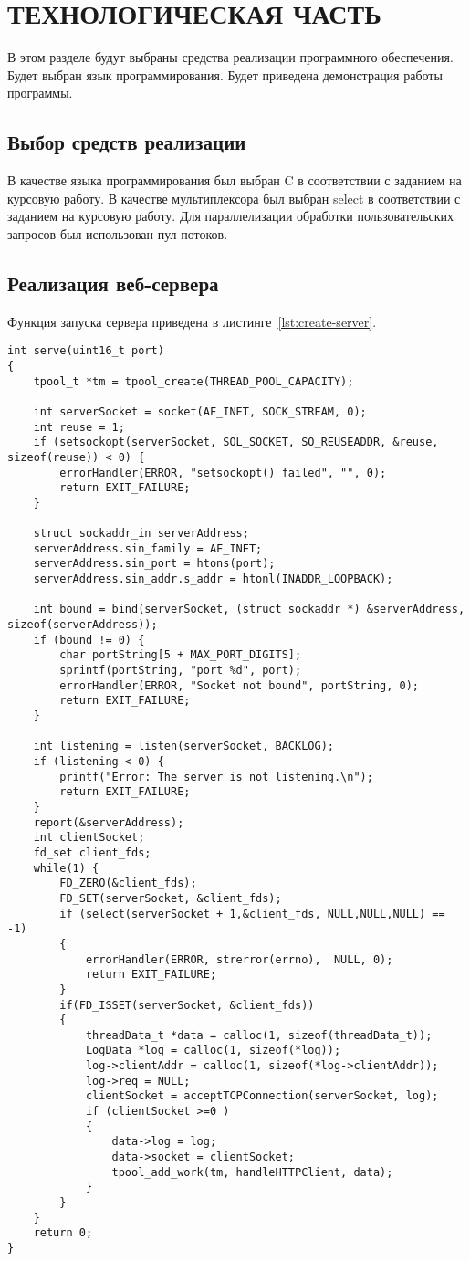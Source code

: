 \chapter{ТЕХНОЛОГИЧЕСКАЯ ЧАСТЬ}

В этом разделе будут выбраны средства реализации программного обеспечения. Будет выбран язык программирования. Будет приведена демонстрация работы программы.

\section{Выбор средств реализации}

В качестве языка программирования был выбран C в соответствии с заданием на курсовую работу. В качестве мультиплексора был выбран select в соответствии с заданием на курсовую работу. Для параллелизации обработки пользовательских запросов был использован пул потоков.

\section{Реализация веб-сервера}

Функция запуска сервера приведена в листинге~\ref{lst:create-server}.

\captionsetup{justification=raggedright,singlelinecheck=off}
\begin{lstlisting}[label=lst:create-server, caption=Запуск сервера]
int serve(uint16_t port)
{
	tpool_t *tm = tpool_create(THREAD_POOL_CAPACITY);
	
	int serverSocket = socket(AF_INET, SOCK_STREAM,	0);
	int reuse = 1;
	if (setsockopt(serverSocket, SOL_SOCKET, SO_REUSEADDR, &reuse, sizeof(reuse)) < 0) {
		errorHandler(ERROR, "setsockopt() failed", "", 0);
		return EXIT_FAILURE;
	}
	
	struct sockaddr_in serverAddress;
	serverAddress.sin_family = AF_INET;
	serverAddress.sin_port = htons(port);
	serverAddress.sin_addr.s_addr = htonl(INADDR_LOOPBACK);
	
	int bound = bind(serverSocket, (struct sockaddr *) &serverAddress, sizeof(serverAddress));
	if (bound != 0) {
		char portString[5 + MAX_PORT_DIGITS];
		sprintf(portString, "port %d", port);
		errorHandler(ERROR, "Socket not bound", portString, 0);
		return EXIT_FAILURE;
	}
	
	int listening = listen(serverSocket, BACKLOG);
	if (listening < 0) {
		printf("Error: The server is not listening.\n");
		return EXIT_FAILURE;
	}
	report(&serverAddress);
	int clientSocket;
	fd_set client_fds;
	while(1) {
		FD_ZERO(&client_fds);
		FD_SET(serverSocket, &client_fds);
		if (select(serverSocket + 1,&client_fds, NULL,NULL,NULL) == -1)
		{
			errorHandler(ERROR, strerror(errno),  NULL, 0);
			return EXIT_FAILURE;
		}
		if(FD_ISSET(serverSocket, &client_fds))
		{
			threadData_t *data = calloc(1, sizeof(threadData_t));
			LogData *log = calloc(1, sizeof(*log));
			log->clientAddr = calloc(1, sizeof(*log->clientAddr));
			log->req = NULL;
			clientSocket = acceptTCPConnection(serverSocket, log);
			if (clientSocket >=0 ) 
			{
				data->log = log;
				data->socket = clientSocket;
				tpool_add_work(tm, handleHTTPClient, data);
			}
		}
	}
	return 0;
}
\end{lstlisting}

